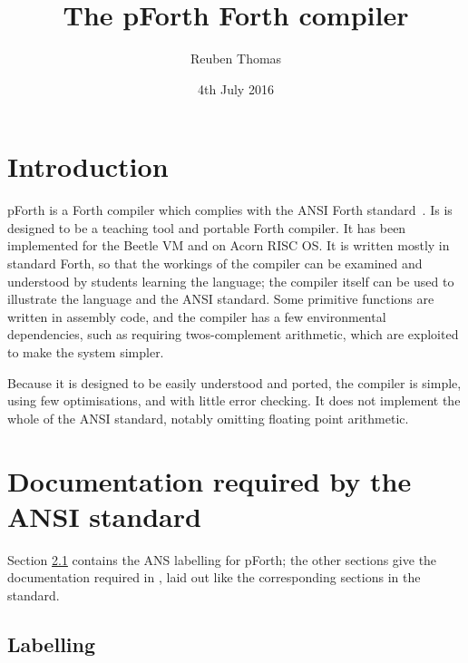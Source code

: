 \documentclass[english]{article}
\begin{document}
\title{The pForth Forth compiler}
\author{Reuben Thomas}
\date{4th July 2016}
\maketitle


\section{Introduction}

pForth is a Forth compiler which complies with the ANSI Forth standard~\cite{ANSIforth}. Is is designed to be a teaching tool and portable Forth compiler. It has been implemented for the Beetle VM and on Acorn RISC OS. It is written mostly in standard Forth, so that the workings of the compiler can be examined and understood by students learning the language; the compiler itself can be used to illustrate the language and the ANSI standard. Some primitive functions are written in assembly code, and the compiler has a few environmental dependencies, such as requiring twos-complement arithmetic, which are exploited to make the system simpler.

Because it is designed to be easily understood and ported, the compiler is
simple, using few optimisations, and with little error checking. It does not
implement the whole of the ANSI standard, notably omitting floating point arithmetic.


\section{Documentation required by the ANSI standard}

Section \ref{labelling} contains the ANS labelling for pForth; the other
sections give the documentation required in \cite[section 4.1]{ANSIforth},
laid out like the corresponding sections in the standard.


\subsection{Labelling}
\label{labelling}
\end{document}
